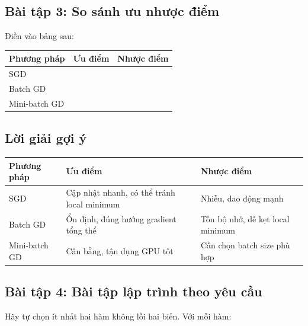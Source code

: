 \subsection*{Bài tập 3: So sánh ưu nhược điểm}

Điền vào bảng sau:

\begin{center}
\begin{tabular}{p{}p{}p{}}
\toprule
Phương pháp & Ưu điểm & Nhược điểm \\
\midrule
SGD &  &  \\
Batch GD &  &  \\
Mini-batch GD &  &  \\
\bottomrule
\end{tabular}
\end{center}

\subsection*{Lời giải gợi ý}

\begin{center}
\begin{tabular}{p{}p{}p{}}
\toprule
Phương pháp & Ưu điểm & Nhược điểm \\
\midrule
SGD & Cập nhật nhanh, có thể tránh local minimum & Nhiễu, dao động mạnh \\
Batch GD & Ổn định, đúng hướng gradient tổng thể & Tốn bộ nhớ, dễ kẹt local minimum \\
Mini-batch GD & Cân bằng, tận dụng GPU tốt & Cần chọn batch size phù hợp \\
\bottomrule
\end{tabular}
\end{center}

\subsection*{Bài tập 4: Bài tập lập trình theo yêu cầu}

Hãy tự chọn ít nhất hai hàm không lồi hai biến. Với mỗi hàm:


